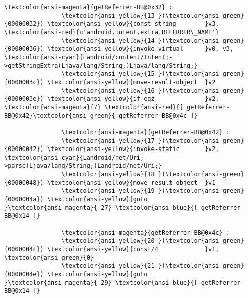 \documentclass{article}
\begin{document}
\begin{Verbatim}[commandchars=\\\{\}]
			    \textcolor{ansi-magenta}{getReferrer-BB@0x32} : 
			    \textcolor{ansi-yellow}{13 }(\textcolor{ansi-green}{00000032}) \textcolor{ansi-yellow}{const-string        }v3, \textcolor{ansi-red}{u'android.intent.extra.REFERRER\_NAME'}
			    \textcolor{ansi-yellow}{14 }(\textcolor{ansi-green}{00000036}) \textcolor{ansi-yellow}{invoke-virtual      }v0, v3, \textcolor{ansi-cyan}{Landroid/content/Intent;->getStringExtra(Ljava/lang/String;)Ljava/lang/String;}
			    \textcolor{ansi-yellow}{15 }(\textcolor{ansi-green}{0000003c}) \textcolor{ansi-yellow}{move-result-object  }v2
			    \textcolor{ansi-yellow}{16 }(\textcolor{ansi-green}{0000003e}) \textcolor{ansi-yellow}{if-eqz              }v2, \textcolor{ansi-magenta}{7} \textcolor{ansi-red}{[ getReferrer-BB@0x42}\textcolor{ansi-green}{ getReferrer-BB@0x4c ]}
			    
			    \textcolor{ansi-magenta}{getReferrer-BB@0x42} : 
			    \textcolor{ansi-yellow}{17 }(\textcolor{ansi-green}{00000042}) \textcolor{ansi-yellow}{invoke-static       }v2, \textcolor{ansi-cyan}{Landroid/net/Uri;->parse(Ljava/lang/String;)Landroid/net/Uri;}
			    \textcolor{ansi-yellow}{18 }(\textcolor{ansi-green}{00000048}) \textcolor{ansi-yellow}{move-result-object  }v1
			    \textcolor{ansi-yellow}{19 }(\textcolor{ansi-green}{0000004a}) \textcolor{ansi-yellow}{goto                }\textcolor{ansi-magenta}{-27} \textcolor{ansi-blue}{[ getReferrer-BB@0x14 ]}
			    
			    \textcolor{ansi-magenta}{getReferrer-BB@0x4c} : 
			    \textcolor{ansi-yellow}{20 }(\textcolor{ansi-green}{0000004c}) \textcolor{ansi-yellow}{const/4             }v1, \textcolor{ansi-green}{0}
			    \textcolor{ansi-yellow}{21 }(\textcolor{ansi-green}{0000004e}) \textcolor{ansi-yellow}{goto                }\textcolor{ansi-magenta}{-29} \textcolor{ansi-blue}{[ getReferrer-BB@0x14 ]}
			    
			    
			    \end{Verbatim}
			    
			    
			    
			
			
			
			\lipsum[1]
			\lipsum[1]
			\lipsum[1]
			\lipsum[1]
			\lipsum[1]
			\lipsum[1]
			\lipsum[1]
			\lipsum[1]
			\pagebreak
\end{document}
